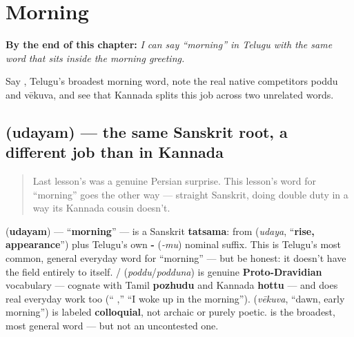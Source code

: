 
\chapter{Morning}
\label{ch:te-morning}

\begin{chapteropening}
\textbf{By the end of this chapter:} \emph{I can say \textquotedblleft{}morning\textquotedblright{} in Telugu with the same word that sits inside the morning greeting.}

Say , Telugu's broadest morning word, note the real native competitors poddu and vēkuva, and see that Kannada splits this job across two unrelated words.
\end{chapteropening}

\section[\texorpdfstring{\te{ఉదయం} (udayam)}{ఉదయం (udayam)}]{ (udayam) — the same Sanskrit root, a different job than in Kannada}

\label{lesson:TE-C26-udayam}



\begin{quote}
Last lesson's  was a genuine Persian surprise. This lesson's word for \textquotedblleft{}morning\textquotedblright{} goes the other way — straight Sanskrit, doing double duty in a way its Kannada cousin doesn't.
\end{quote}

\begin{cousinweb}
\textbf{} (\textbf{udayam}) — \textquotedblleft{}\textbf{morning}\textquotedblright{} — is a Sanskrit \textbf{tatsama}: from \textbf{} (\emph{udaya}, \textquotedblleft{}\textbf{rise, appearance}\textquotedblright{}) plus Telugu's own \textbf{-} (\emph{-mu}) nominal suffix. This is Telugu's most common, general everyday word for \textquotedblleft{}morning\textquotedblright{} — but be honest: it doesn't have the field entirely to itself. \textbf{}/\textbf{} (\emph{poddu}/\emph{podduna}) is genuine \textbf{Proto-Dravidian} vocabulary — cognate with Tamil \textbf{pozhudu} and Kannada \textbf{hottu} — and does real everyday work too (\textquotedblleft{}\textbf{ },\textquotedblright{} \textquotedblleft{}I woke up in the morning\textquotedblright{}). \textbf{} (\emph{vēkuva}, \textquotedblleft{}dawn, early morning\textquotedblright{}) is labeled \textbf{colloquial}, not archaic or purely poetic.  is the broadest, most general word — but not an uncontested one.
\end{cousinweb}

